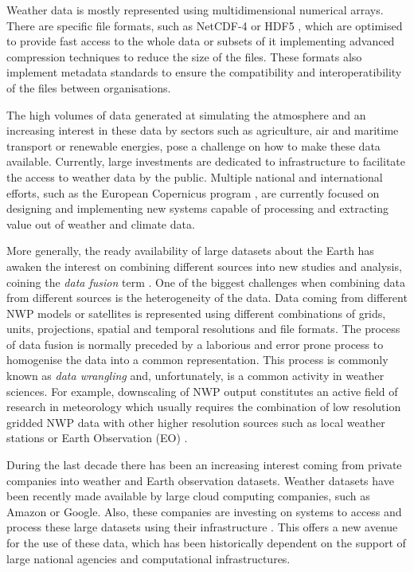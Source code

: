 \medskip

Weather data is mostly represented using multidimensional numerical arrays. There are specific file formats, such as NetCDF-4 \citep{rew2006netcdf} or HDF5 \citep{folk2011overview}, which are optimised to provide fast access to the whole data or subsets of it implementing advanced compression techniques to reduce the size of the files. These formats also implement metadata standards to ensure the compatibility and interoperatibility of the files between organisations.

\medskip

The high volumes of data generated at simulating the atmosphere and an increasing interest in these data by sectors such as agriculture, air and maritime transport or renewable energies, pose a challenge on how to make these data available. Currently, large investments are dedicated to infrastructure to facilitate the access to weather data by the public. Multiple national and international efforts, such as the European Copernicus program \citep{copernicus}, are currently focused on designing and implementing new systems capable of processing and extracting value out of weather and climate data.

\medskip

More generally, the ready availability of large datasets about the Earth has awaken the interest on combining different sources into new studies and analysis, coining the \textit{data fusion} term \citep{wald1999some}. One of the biggest challenges when combining data from different sources is the heterogeneity of the data. Data coming from different NWP models or satellites is represented using different combinations of grids, units, projections, spatial and temporal resolutions and file formats. The process of data fusion is normally preceded by a laborious and error prone process to homogenise the data into a common representation. This process is commonly known as \textit{data wrangling} \citep{goldston2008big} and, unfortunately, is a common activity in weather sciences. For example, downscaling of NWP output constitutes an active field of research in meteorology which usually requires the combination of low resolution gridded NWP data with other higher resolution sources such as local weather stations or Earth Observation (EO) \citep{giebel2011state,renzullo2016improved}.

\medskip

During the last decade there has been an increasing interest coming from private companies into weather and Earth observation datasets. Weather datasets have been recently made available by large cloud computing companies, such as Amazon or Google. Also, these companies are investing on systems to access and process these large datasets using their infrastructure \citep{gorelick2017google,earthaws}. This offers a new avenue for the use of these data, which has been historically dependent on the support of large national agencies and computational infrastructures.

